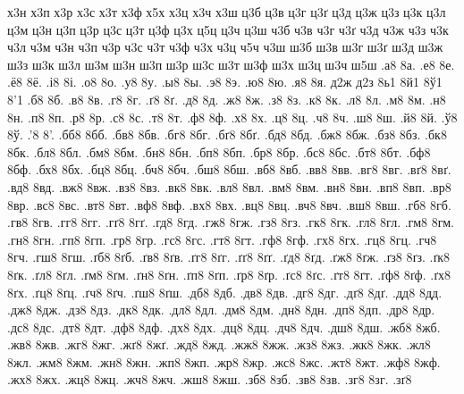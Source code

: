 {х3н
х3п
х3р
х3с
х3т
х3ф
х5х
х3ц
х3ч
х3ш
ц3б
ц3в
ц3г
ц3ґ
ц3д
ц3ж
ц3з
ц3к
ц3л
ц3м
ц3н
ц3п
ц3р
ц3с
ц3т
ц3ф
ц3х
ц5ц
ц3ч
ц3ш
ч3б
ч3в
ч3г
ч3ґ
ч3д
ч3ж
ч3з
ч3к
ч3л
ч3м
ч3н
ч3п
ч3р
ч3с
ч3т
ч3ф
ч3х
ч3ц
ч5ч
ч3ш
ш3б
ш3в
ш3г
ш3ґ
ш3д
ш3ж
ш3з
ш3к
ш3л
ш3м
ш3н
ш3п
ш3р
ш3с
ш3т
ш3ф
ш3х
ш3ц
ш3ч
ш5ш
.а8
8а.
.е8
8е.
.ё8
8ё.
.і8
8і.
.о8
8о.
.у8
8у.
.ы8
8ы.
.э8
8э.
.ю8
8ю.
.я8
8я.
д2ж
д2з
8ь1
8й1
8ў1
8'1
.б8
8б.
.в8
8в.
.г8
8г.
.ґ8
8ґ.
.д8
8д.
.ж8
8ж.
.з8
8з.
.к8
8к.
.л8
8л.
.м8
8м.
.н8
8н.
.п8
8п.
.р8
8р.
.с8
8с.
.т8
8т.
.ф8
8ф.
.х8
8х.
.ц8
8ц.
.ч8
8ч.
.ш8
8ш.
.й8
8й.
.ў8
8ў.
.'8
8'.
.бб8
8бб.
.бв8
8бв.
.бг8
8бг.
.бґ8
8бґ.
.бд8
8бд.
.бж8
8бж.
.бз8
8бз.
.бк8
8бк.
.бл8
8бл.
.бм8
8бм.
.бн8
8бн.
.бп8
8бп.
.бр8
8бр.
.бс8
8бс.
.бт8
8бт.
.бф8
8бф.
.бх8
8бх.
.бц8
8бц.
.бч8
8бч.
.бш8
8бш.
.вб8
8вб.
.вв8
8вв.
.вг8
8вг.
.вґ8
8вґ.
.вд8
8вд.
.вж8
8вж.
.вз8
8вз.
.вк8
8вк.
.вл8
8вл.
.вм8
8вм.
.вн8
8вн.
.вп8
8вп.
.вр8
8вр.
.вс8
8вс.
.вт8
8вт.
.вф8
8вф.
.вх8
8вх.
.вц8
8вц.
.вч8
8вч.
.вш8
8вш.
.гб8
8гб.
.гв8
8гв.
.гг8
8гг.
.гґ8
8гґ.
.гд8
8гд.
.гж8
8гж.
.гз8
8гз.
.гк8
8гк.
.гл8
8гл.
.гм8
8гм.
.гн8
8гн.
.гп8
8гп.
.гр8
8гр.
.гс8
8гс.
.гт8
8гт.
.гф8
8гф.
.гх8
8гх.
.гц8
8гц.
.гч8
8гч.
.гш8
8гш.
.ґб8
8ґб.
.ґв8
8ґв.
.ґг8
8ґг.
.ґґ8
8ґґ.
.ґд8
8ґд.
.ґж8
8ґж.
.ґз8
8ґз.
.ґк8
8ґк.
.ґл8
8ґл.
.ґм8
8ґм.
.ґн8
8ґн.
.ґп8
8ґп.
.ґр8
8ґр.
.ґс8
8ґс.
.ґт8
8ґт.
.ґф8
8ґф.
.ґх8
8ґх.
.ґц8
8ґц.
.ґч8
8ґч.
.ґш8
8ґш.
.дб8
8дб.
.дв8
8дв.
.дг8
8дг.
.дґ8
8дґ.
.дд8
8дд.
.дж8
8дж.
.дз8
8дз.
.дк8
8дк.
.дл8
8дл.
.дм8
8дм.
.дн8
8дн.
.дп8
8дп.
.др8
8др.
.дс8
8дс.
.дт8
8дт.
.дф8
8дф.
.дх8
8дх.
.дц8
8дц.
.дч8
8дч.
.дш8
8дш.
.жб8
8жб.
.жв8
8жв.
.жг8
8жг.
.жґ8
8жґ.
.жд8
8жд.
.жж8
8жж.
.жз8
8жз.
.жк8
8жк.
.жл8
8жл.
.жм8
8жм.
.жн8
8жн.
.жп8
8жп.
.жр8
8жр.
.жс8
8жс.
.жт8
8жт.
.жф8
8жф.
.жх8
8жх.
.жц8
8жц.
.жч8
8жч.
.жш8
8жш.
.зб8
8зб.
.зв8
8зв.
.зг8
8зг.
.зґ8
}
